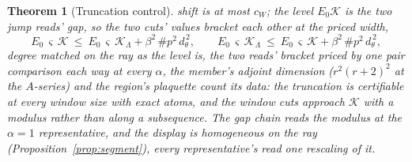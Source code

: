 \documentclass[11pt]{article}
\newtheorem{theorem}{Theorem}
\theoremstyle{definition}
\begin{document}
\begin{theorem}[Truncation control]
shift is at most $c_W$; the level
$E_0\mathcal K$ is the two jump reads' gap, so the two cuts' values
bracket each other at the priced width,
\[
E_0\,\varsigma\,\mathcal K\ \le\ E_0\,\varsigma\,\mathcal K_\Lambda
+\beta^2\,\#p^2\,d_\theta^{\,2} ,
\qquad
E_0\,\varsigma\,\mathcal K_\Lambda\ \le\ E_0\,\varsigma\,\mathcal K
+\beta^2\,\#p^2\,d_\theta^{\,2} ,
\]
degree matched on the ray as the level is, the two reads' bracket
priced by one pair comparison each way at every $\alpha$, the
member's adjoint dimension ($r^2(r+2)^2$ at the $A$-series) and
the region's plaquette count its data: the truncation is certifiable at every window size with exact
atoms, and the window cuts approach $\mathcal K$ with a modulus rather than
along a subsequence. The gap chain reads the modulus at the $\alpha{=}1$ representative, and the
display is homogeneous on the ray (Proposition~\ref{prop:segment}), every
representative's read one rescaling of it.

\end{theorem}
\end{document}
